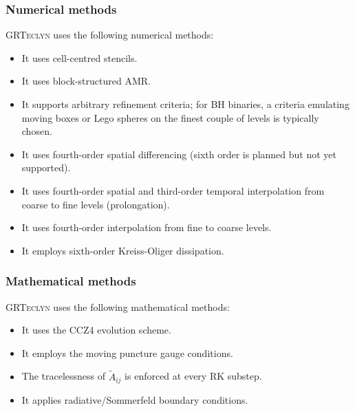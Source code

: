 \documentclass[12pt,a4paper]{article}
\numberwithin{figure}{subsection}
\newcommand{\grteclyn}{\textsc{GRTeclyn}\xspace}
\begin{document}
\subsubsection{Numerical methods}
\grteclyn uses the following numerical methods:
\begin{itemize}
    \item It uses cell-centred stencils.
    \item It uses block-structured AMR.
    \item It supports arbitrary refinement criteria; for BH binaries, a
    criteria emulating moving boxes or Lego spheres on the finest couple of
    levels is typically chosen.
    \item It uses fourth-order spatial differencing (sixth order is planned but
    not yet supported).
    \item It uses fourth-order spatial and third-order temporal interpolation
    from coarse to fine levels (prolongation).
    \item It uses fourth-order interpolation from fine to coarse levels.
    \item It employs sixth-order Kreiss-Oliger dissipation.
\end{itemize}

\subsubsection{Mathematical methods}
\grteclyn uses the following mathematical methods:
\begin{itemize}
    \item It uses the CCZ4 evolution scheme.
    \item It employs the moving puncture gauge conditions.
    \item The tracelessness of $\tilde{A}_{ij}$ is enforced at every RK substep.
    \item It applies radiative/Sommerfeld boundary conditions.
\end{itemize}
\end{document}
